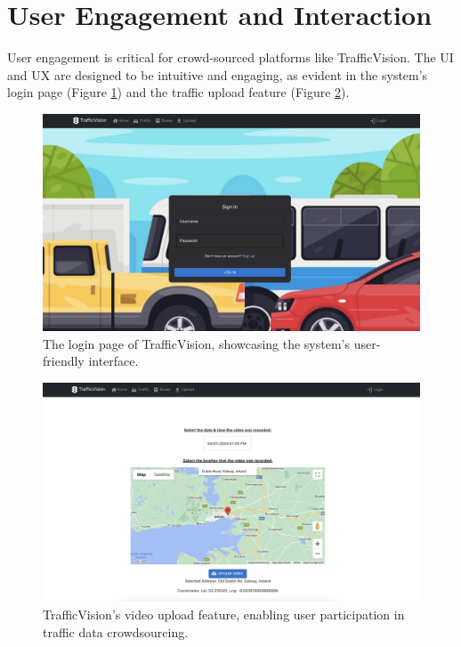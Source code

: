 \section{User Engagement and Interaction}

User engagement is critical for crowd-sourced platforms like TrafficVision. The UI and UX are designed to be intuitive and engaging, as evident in the system's login page (Figure \ref{fig:loginUI}) and the traffic upload feature (Figure \ref{fig:uploadUI}).

\begin{figure}[H]
    \centering
    \includegraphics[width=\linewidth]{images/loginUI.png}
    \caption{The login page of TrafficVision, showcasing the system's user-friendly interface.}
    \label{fig:loginUI}
\end{figure}

\begin{figure}[H]
    \centering
    \includegraphics[width=\linewidth]{images/uploadUI.png}
    \caption{TrafficVision's video upload feature, enabling user participation in traffic data crowdsourcing.}
    \label{fig:uploadUI}
\end{figure}

